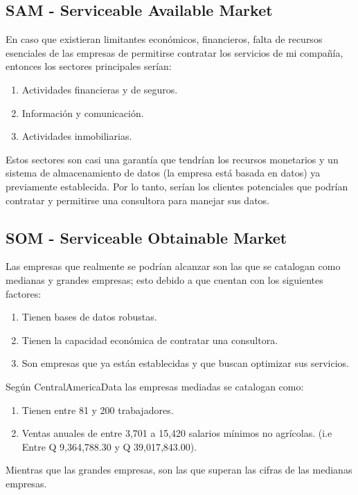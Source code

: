 \subsection{SAM - Serviceable Available Market}

En caso que existieran limitantes económicos, financieros, falta de recursos esenciales de las empresas de permitirse contratar los servicios de mi compañía, entonces los sectores principales serían: 
\begin{enumerate}
	\item Actividades financieras y de seguros.
	\item Información y comunicación.
	\item Actividades inmobiliarias.
\end{enumerate}

Estos sectores son casi una garantía que tendrían los recursos monetarios y un sistema de almacenamiento de datos (la empresa está basada en datos) ya previamente establecida. Por lo tanto, serían los clientes potenciales que podrían contratar y permitirse una consultora para manejar sus datos. 


\subsection{SOM -  Serviceable Obtainable Market}

Las empresas que realmente se podrían alcanzar son las que se catalogan como medianas y grandes empresas; esto debido a que cuentan con los siguientes factores: 

\begin{enumerate}
	\item Tienen bases de datos robustas. 
	\item Tienen la capacidad económica de contratar una consultora. 
	\item Son empresas que ya están establecidas y que buscan optimizar sus servicios. 
\end{enumerate}

Según CentralAmericaData\cite{central_america_data_clasificacion_2015} las empresas mediadas se catalogan como: 

\begin{enumerate}
	\item Tienen entre 81 y 200 trabajadores. 
	\item  Ventas anuales de entre 3,701 a 15,420 salarios mínimos no agrícolas. (i.e Entre Q 9,364,788.30 y Q 39,017,843.00). 
\end{enumerate}

Mientras que las grandes empresas, son las que superan las cifras de las medianas empresas. 






